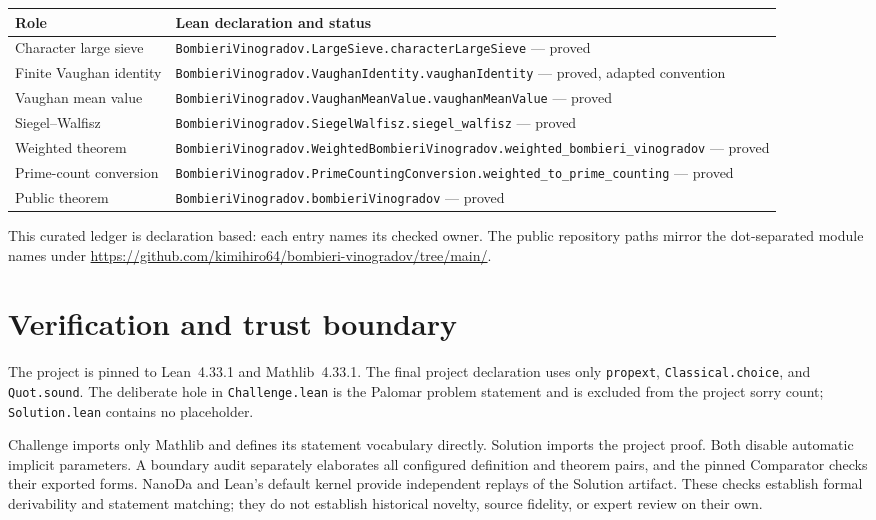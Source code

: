 \documentclass[11pt]{amsart}
\newcommand{\leanname}[1]{\nolinkurl{#1}}
\theoremstyle{definition}
\theoremstyle{remark}
\begin{document}
\begin{center}
\small
\begin{tabular}{>{\raggedright\arraybackslash}p{}>{\raggedright\arraybackslash}p{}}
\toprule
Role & Lean declaration and status \\
\midrule
Character large sieve &
\leanname{BombieriVinogradov.LargeSieve.characterLargeSieve} --- proved \\
Finite Vaughan identity &
\leanname{BombieriVinogradov.VaughanIdentity.vaughanIdentity} --- proved, adapted convention \\
Vaughan mean value &
\leanname{BombieriVinogradov.VaughanMeanValue.vaughanMeanValue} --- proved \\
Siegel--Walfisz &
\leanname{BombieriVinogradov.SiegelWalfisz.siegel_walfisz} --- proved \\
Weighted theorem &
\leanname{BombieriVinogradov.WeightedBombieriVinogradov.weighted_bombieri_vinogradov} --- proved \\
Prime-count conversion &
\leanname{BombieriVinogradov.PrimeCountingConversion.weighted_to_prime_counting} --- proved \\
Public theorem &
\leanname{BombieriVinogradov.bombieriVinogradov} --- proved \\
\bottomrule
\end{tabular}
\end{center}

This curated ledger is declaration based: each entry names its checked owner.
The public repository paths mirror the dot-separated module names under
\url{https://github.com/kimihiro64/bombieri-vinogradov/tree/main/}.

\section{Verification and trust boundary}

The project is pinned to Lean~4.33.1 and Mathlib~4.33.1. The final project
declaration uses only \texttt{propext}, \texttt{Classical.choice}, and
\texttt{Quot.sound}. The deliberate hole in \texttt{Challenge.lean} is the
Palomar problem statement and is excluded from the project sorry count;
\texttt{Solution.lean} contains no placeholder.

Challenge imports only Mathlib and defines its statement vocabulary directly.
Solution imports the project proof. Both disable automatic implicit
parameters. A boundary audit separately elaborates all configured definition
and theorem pairs, and the pinned Comparator checks their exported forms.
NanoDa and Lean's default kernel provide independent replays of the Solution
artifact. These checks establish formal derivability and statement matching;
they do not establish historical novelty, source fidelity, or expert review
on their own.
\end{document}
